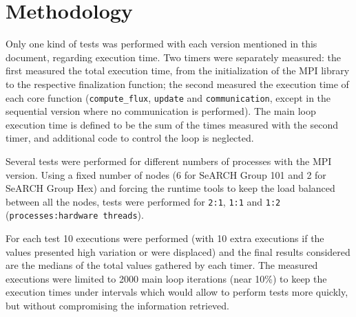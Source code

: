 \section{Methodology}
\label{sec:methodology}

Only one kind of tests was performed with each version mentioned in this document, regarding execution time. Two timers were separately measured: the first measured the total execution time, from the initialization of the MPI library to the respective finalization function; the second measured the execution time of each core function (\texttt{compute\_flux}, \texttt{update} and \texttt{communication}, except in the sequential version where no communication is performed). The main loop execution time is defined to be the sum of the times measured with the second timer, and additional code to control the loop is neglected.

Several tests were performed for different numbers of processes with the MPI version. Using a fixed number of nodes (6 for SeARCH Group 101 and 2 for SeARCH Group Hex) and forcing the runtime tools to keep the load balanced between all the nodes, tests were performed for \texttt{2:1}, \texttt{1:1} and \texttt{1:2} (\texttt{processes:hardware threads}).

For each test 10 executions were performed (with 10 extra executions if the values presented high variation or were displaced) and the final results considered are the medians of the total values gathered by each timer. The measured executions were limited to 2000 main loop iterations (near 10\%) to keep the execution times under intervals which would allow to perform tests more quickly, but without compromising the information retrieved.
